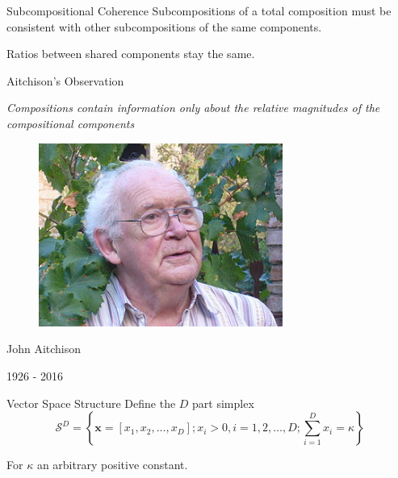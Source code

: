 \documentclass[dark]{cgem-presentation}
\begin{document}
\begin{frame}{Subcompositional Coherence}
	\LARGE
	Subcompositions of a total composition must be consistent
	with other subcompositions of the same components.

	\vspace{5mm}
	Ratios between shared components stay the same.
\end{frame}

\begin{frame}{Aitchison's Observation}
	\LARGE
	\begin{center}
		\textit{
			Compositions contain information only about the relative
			magnitudes of the compositional components
		}
	\end{center}
\end{frame}

\begin{frame}[plain]
	\large
	\vspace{5mm}
	\begin{figure}
		\includegraphics[width=8cm]{aitchison}
	\end{figure}
	\begin{center}
		John Aitchison

		1926 - 2016
	\end{center}
\end{frame}

\begin{frame}{Vector Space Structure}
	\LARGE
	Define the $D$ part simplex
	\Large
	\begin{equation*}
		\mathcal{S}^D = \left\{ \mathbf{x} = [x_1, x_2, \ldots , x_D];
		x_i > 0, i = 1, 2, \ldots , D; \sum^D_{i=1} x_i
		= \kappa \right\}
	\end{equation*}

	\LARGE
	\vspace{3mm}
	For $\kappa$ an arbitrary positive constant.
\end{frame}
\end{document}

